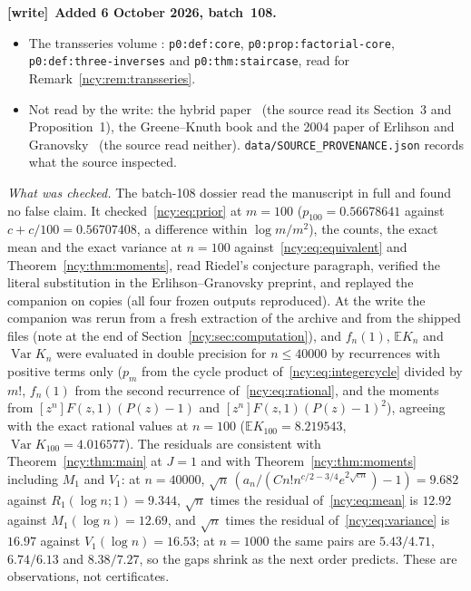 \documentclass[11pt,letterpaper]{article}
\numberwithin{equation}{section}
\theoremstyle{remark}\newtheorem{remark}[theorem]{Remark}
\newcommand{\EE}{\mathbb E}
\newcommand{\Var}{\operatorname{Var}}
\newcommand{\file}[1]{\nolinkurl{#1}}
\newenvironment{writenote}[1][]{\par\smallskip\begingroup\small
 \noindent\textbf{[write]}\if\relax\detokenize{#1}\relax\else~\textbf{#1.}\fi\ }%
 {\par\endgroup\smallskip}
\theoremstyle{definition}\newtheorem{definition}[theorem]{Definition}\theoremstyle{plain}
\begin{document}
\begin{writenote}[Added 6 October 2026, batch~108]
\begin{itemize}
 arXiv:math/0507343v3 (19~June 2007), Section~4 from~(4.37) to~(4.55) and
 Section~5 around~(5.121), and the published text (numdam), pp.~925--927
 and~936--938 (Remark~\ref{ncy:rem:eg}).
\item The transseries volume
 :
 \file{p0:def:core}, \file{p0:prop:factorial-core},
 \file{p0:def:three-inverses} and \file{p0:thm:staircase}, read for
 Remark~\ref{ncy:rem:transseries}.
\item Not read by the write: the hybrid paper~\cite{hybrid} (the source read
 its Section~3 and Proposition~1), the Greene--Knuth book and the 2004 paper
 of Erlihson and Granovsky~\cite{eg2004} (the source read neither).
 \file{data/SOURCE_PROVENANCE.json} records what the source inspected.
\end{itemize}

\emph{What was checked.} The batch-108 dossier read the manuscript in full
and found no false claim. It checked~\eqref{ncy:eq:prior} at $m=100$
($p_{100}=0.56678641$ against $c+c/100=0.56707408$, a difference within
$\log m/m^2$), the counts, the exact mean and the exact variance at $n=100$
against~\eqref{ncy:eq:equivalent} and Theorem~\ref{ncy:thm:moments}, read
Riedel's conjecture paragraph, verified the literal substitution in the
Erlihson--Granovsky preprint, and replayed the companion on copies (all four
frozen outputs reproduced). At the write the companion was rerun from a fresh
extraction of the archive and from the shipped files (note at the end of
Section~\ref{ncy:sec:computation}), and $f_n(1)$, $\EE K_n$ and $\Var K_n$
were evaluated in double precision for $n\le40000$ by recurrences with
positive terms only ($p_m$ from the cycle product
of~\eqref{ncy:eq:integercycle} divided by $m!$, $f_n(1)$ from the second
recurrence of~\eqref{ncy:eq:rational}, and the moments from
$[z^n]F(z,1)(P(z)-1)$ and $[z^n]F(z,1)(P(z)-1)^2$), agreeing with the exact
rational values at
$n=100$ ($\EE K_{100}=8.219543$, $\Var K_{100}=4.016577$). The residuals are
consistent with Theorem~\ref{ncy:thm:main} at $J=1$ and with
Theorem~\ref{ncy:thm:moments} including $M_1$ and $V_1$: at $n=40000$,
$\sqrt n\,(a_n/(Cn!n^{c/2-3/4}e^{2\sqrt{cn}})-1)=9.682$ against
$R_1(\log n;1)=9.344$, $\sqrt n$ times the residual of~\eqref{ncy:eq:mean} is
$12.92$ against $M_1(\log n)=12.69$, and $\sqrt n$ times the residual
of~\eqref{ncy:eq:variance} is $16.97$ against $V_1(\log n)=16.53$; at
$n=1000$ the same pairs are $5.43/4.71$, $6.74/6.13$ and $8.38/7.27$, so the
gaps shrink as the next order predicts. These are observations, not
certificates.


\end{writenote}
\end{document}
